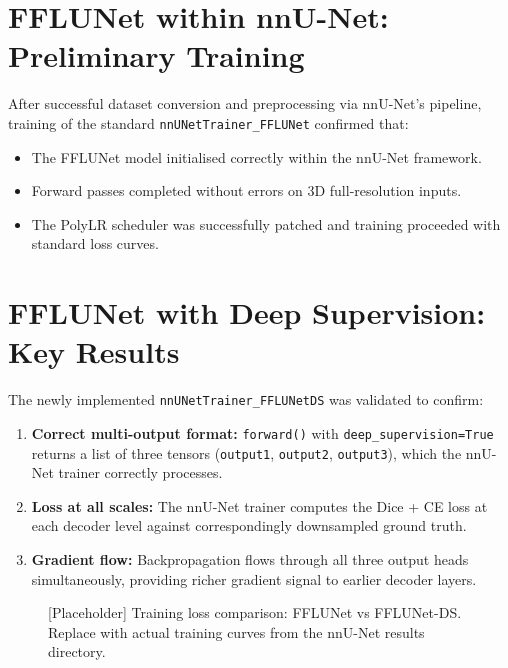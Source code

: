 \documentclass[12pt,a4paper]{report}
\begin{document}
\section{FFLUNet within nnU-Net: Preliminary Training}

After successful dataset conversion and preprocessing via nnU-Net's pipeline, training of the standard \texttt{nnUNetTrainer\_FFLUNet} confirmed that:
\begin{itemize}[leftmargin=*]
    \item The FFLUNet model initialised correctly within the nnU-Net framework.
    \item Forward passes completed without errors on 3D full-resolution inputs.
    \item The PolyLR scheduler was successfully patched and training proceeded with standard loss curves.
\end{itemize}

\section{FFLUNet with Deep Supervision: Key Results}

The newly implemented \texttt{nnUNetTrainer\_FFLUNetDS} was validated to confirm:
\begin{enumerate}[leftmargin=*]
    \item \textbf{Correct multi-output format:} \texttt{forward()} with \texttt{deep\_supervision=True} returns a list of three tensors (\texttt{output1}, \texttt{output2}, \texttt{output3}), which the nnU-Net trainer correctly processes.
    \item \textbf{Loss at all scales:} The nnU-Net trainer computes the Dice + CE loss at each decoder level against correspondingly downsampled ground truth.
    \item \textbf{Gradient flow:} Backpropagation flows through all three output heads simultaneously, providing richer gradient signal to earlier decoder layers.
\end{enumerate}

\begin{figure}[H]
\centering
{}
\caption{[Placeholder] Training loss comparison: FFLUNet vs FFLUNet-DS. Replace with actual training curves from the nnU-Net results directory.}
\label{fig:loss_comparison}
\end{figure}
\end{document}
